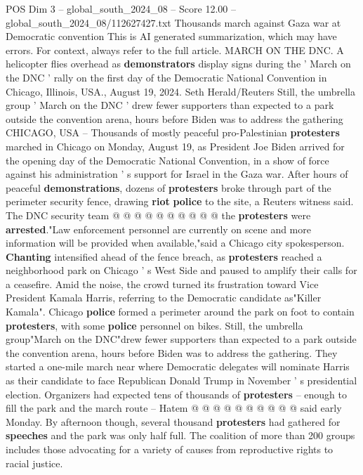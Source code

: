 \begin{textsample}{POS Dim 3 – global\_south\_2024\_08 – Score 12.00 – global\_south\_2024\_08/112627427.txt}  \label{ex:f3_pos_337}
Thousands march against Gaza war at Democratic convention This is AI generated summarization, which may have errors.
For context, always refer to the full article.
MARCH ON THE DNC.
A helicopter flies overhead as \textbf{demonstrators} display signs during the ' March on the DNC ' rally on the first day of the Democratic National Convention in Chicago, Illinois, USA., August 19, 2024.
Seth Herald/Reuters Still, the umbrella group ' March on the DNC ' drew fewer supporters than expected to a park outside the convention arena, hours before Biden was to address the gathering CHICAGO, USA -- Thousands of mostly peaceful pro-Palestinian \textbf{protesters} marched in Chicago on Monday, August 19, as President Joe Biden arrived for the opening day of the Democratic National Convention, in a show of force against his administration ' s support for Israel in the Gaza war.
After hours of peaceful \textbf{demonstrations}, dozens of \textbf{protesters} broke through part of the perimeter security fence, drawing \textbf{riot} \textbf{police} to the site, a Reuters witness said.
The DNC security team @ @ @ @ @ @ @ @ @ @ the \textbf{protesters} were \textbf{arrested}."Law enforcement personnel are currently on scene and more information will be provided when available,"said a Chicago city spokesperson. \textbf{Chanting} intensified ahead of the fence breach, as \textbf{protesters} reached a neighborhood park on Chicago ' s West Side and paused to amplify their calls for a ceasefire.
Amid the noise, the crowd turned its frustration toward Vice President Kamala Harris, referring to the Democratic candidate as"Killer Kamala".
Chicago \textbf{police} formed a perimeter around the park on foot to contain \textbf{protesters}, with some \textbf{police} personnel on bikes.
Still, the umbrella group"March on the DNC"drew fewer supporters than expected to a park outside the convention arena, hours before Biden was to address the gathering.
They started a one-mile march near where Democratic delegates will nominate Harris as their candidate to face Republican Donald Trump in November ' s presidential election.
Organizers had expected tens of thousands of \textbf{protesters} -- enough to fill the park and the march route -- Hatem @ @ @ @ @ @ @ @ @ @ said early Monday.
By afternoon though, several thousand \textbf{protesters} had gathered for \textbf{speeches} and the park was only half full.
The coalition of more than 200 groups includes those advocating for a variety of causes from reproductive rights to racial justice.

\end{textsample}
